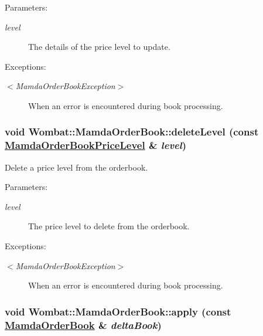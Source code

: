 \begin{Desc}
\item[Parameters:]
\begin{description}
\item[{\em level}]The details of the price level to update.\end{description}
\end{Desc}
\begin{Desc}
\item[Exceptions:]
\begin{description}
\item[{\em $<$Mamda\-Order\-Book\-Exception$>$}]When an error is encountered during book processing. \end{description}
\end{Desc}
\hypertarget{classWombat_1_1MamdaOrderBook_3e9404b31ed55a5b5b82ac1b0064aacd}{
\subsubsection[deleteLevel]{\setlength{\rightskip}{0pt plus 5cm}void Wombat::Mamda\-Order\-Book::delete\-Level (const \hyperlink{classWombat_1_1MamdaOrderBookPriceLevel}{Mamda\-Order\-Book\-Price\-Level} \& {\em level})}}
\label{classWombat_1_1MamdaOrderBook_3e9404b31ed55a5b5b82ac1b0064aacd}


Delete a price level from the orderbook. 

\begin{Desc}
\item[Parameters:]
\begin{description}
\item[{\em level}]The price level to delete from the orderbook.\end{description}
\end{Desc}
\begin{Desc}
\item[Exceptions:]
\begin{description}
\item[{\em $<$Mamda\-Order\-Book\-Exception$>$}]When an error is encountered during book processing. \end{description}
\end{Desc}
\hypertarget{classWombat_1_1MamdaOrderBook_1b56ce5dd8c4bf64c84c93c351a42b3f}{
\subsubsection[apply]{\setlength{\rightskip}{0pt plus 5cm}void Wombat::Mamda\-Order\-Book::apply (const \hyperlink{classWombat_1_1MamdaOrderBook}{Mamda\-Order\-Book} \& {\em delta\-Book})}}
\label{classWombat_1_1MamdaOrderBook_1b56ce5dd8c4bf64c84c93c351a42b3f}


